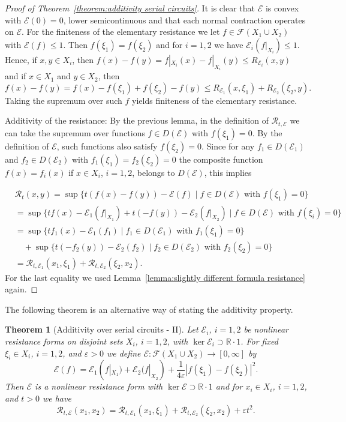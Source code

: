 \documentclass[a4paper,11pt,reqno]{amsart}
\newtheorem{theorem}[lemma]{Theorem}
\theoremstyle{definition}
\numberwithin{equation}{section}
\newcommand{\cR}{{\mathcal R}}
\newcommand{\cE}{{\mathcal E}}
\newcommand{\cF}{{\mathcal F}}
\newcommand{\R}{{\mathbb R}}
\newcommand{\1}{\mathds{1}}
\begin{document}
\begin{proof}[Proof of Theorem~\ref{theorem:additivity serial circuits}]
It is clear that $\cE$ is convex with $\cE(0) = 0$, lower semicontinuous and that each normal contraction operates on $\cE$. For the finiteness of the elementary resistance we let $f \in \cF(X_1 \cup X_2)$ with $\cE(f) \leq 1$. Then $f(\xi_1) = f(\xi_2)$ and for $i =1,2$ we have $\cE_i(f|_{X_i}) \leq 1$. Hence, if $x,y \in X_i$, then $f(x) - f(y) = f|_{X_i}(x) - f|_{X_i}(y) \leq R_{\cE_i}(x,y)$ and if $x \in X_1$ and $y \in X_2$, then 
%
$$f(x) - f(y)  = f(x) - f(\xi_1) + f(\xi_2) - f(y) \leq R_{\cE_1}(x,\xi_1) + R_{\cE_2}(\xi_2,y). $$
%
Taking the supremum over such $f$ yields finiteness of the elementary resistance.   
 
Additivity of the resistance: By the previous lemma, in the definition of $\cR_{t,\cE}$ we can take the supremum over functions $f \in D(\cE)$ with $f(\xi_1)  = 0$. By the definition of $\cE$, such functions also satisfy $f(\xi_2)= 0$. Since for any $f_1 \in D(\cE_1)$ and $f_2 \in D(\cE_2)$ with $f_1(\xi_1) = f_2(\xi_2) = 0$ the composite function $f(x) = f_i(x)$ if $x \in X_i$, $i = 1,2$, belongs to $D(\cE)$, this implies

 \begin{align*}
 &\cR_t(x,y) = \sup\{t(f(x) - f(y)) - \cE(f) \mid f \in D(\cE) \text{ with } f(\xi_1) =  0 \}\\
 &= \sup\{tf(x) - \cE_1(f|_{X_1}) + t(-  f(y)) - \cE_2(f|_{X_2}) \mid f \in D(\cE) \text{ with } f(\xi_i) =  0\}\\
 &= \sup\{tf_1(x) - \cE_1(f_1) \mid f_1 \in D(\cE_1) \text{ with } f_1(\xi_1) = 0\}\\
 &\quad + \sup\{t (- f_2(y)) - \cE_2(f_2) \mid f_2 \in D(\cE_2) \text{ with } f_2(\xi_2) = 0\}\\
 &= \cR_{t,\cE_1}(x_1,\xi_1)  + \cR_{t,\cE_2}(\xi_2,x_2).
 \end{align*}
%
For the last equality we used Lemma~\ref{lemma:slightly different formula resistance} again. 
\end{proof}

The following theorem is  an alternative way of stating the additivity property. 


\begin{theorem}[Additivity over serial circuits - II] \label{theorem:additivity serial circuitsII}
 Let $\cE_i$, $i = 1,2$ be nonlinear resistance forms on disjoint sets $X_i$, $i = 1,2$, with $\ker \cE_i \supset \R \cdot 1$. For fixed $\xi_i \in X_i$, $i = 1,2$, and $\varepsilon > 0$ we define $\cE  \colon \cF(X_1 \cup X_2) \to [0,\infty]$ by
 $$\cE(f) = \cE_1(f|_{X_1}) + \cE_2(f|_{X_2}) + \frac{1}{4\varepsilon} |f(\xi_1) - f(\xi_2)|^2. 
$$
 Then $\cE$ is a nonlinear resistance form with $\ker \cE \supset \R \cdot 1$ and for $x_i \in X_i$, $i = 1,2$, and $t > 0$  we have
 $$\cR_{t,\cE}(x_1,x_2) = \cR_{t,\cE_1}(x_1,\xi_1)  + \cR_{t,\cE_2}(\xi_2,x_2) + \varepsilon t^2.$$
\end{theorem}
\end{document}
